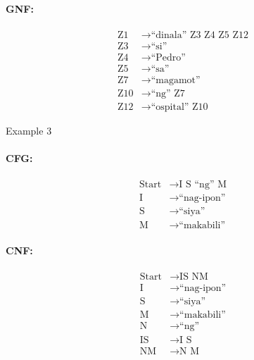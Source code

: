 \paragraph{GNF:}
\begin{equation*}
    \begin{aligned}
        \text{Z1}   & \rightarrow \text{“dinala” Z3 Z4 Z5 Z12}   \\
        \text{Z3} & \rightarrow \text{“si”} \\
        \text{Z4} & \rightarrow \text{“Pedro”} \\
        \text{Z5} & \rightarrow \text{“sa”} \\
        \text{Z7} & \rightarrow \text{“magamot”} \\
        \text{Z10} & \rightarrow \text{“ng” Z7} \\
        \text{Z12} & \rightarrow \text{“ospital” Z10}
    \end{aligned}
\end{equation*}

Example 3
\paragraph{CFG:}
\begin{equation*}
    \begin{aligned}
        \text{Start}   & \rightarrow \text{I S “ng” M}   \\
        \text{I} & \rightarrow \text{“nag-ipon”} \\
        \text{S} & \rightarrow \text{“siya”} \\
        \text{M} & \rightarrow \text{“makabili”}
    \end{aligned}
\end{equation*}

\paragraph{CNF:}
\begin{equation*}
    \begin{aligned}
        \text{Start}   & \rightarrow \text{IS NM}   \\
        \text{I} & \rightarrow \text{“nag-ipon”} \\
        \text{S} & \rightarrow \text{“siya”} \\
        \text{M} & \rightarrow \text{“makabili”} \\
        \text{N} & \rightarrow \text{“ng”} \\
        \text{IS} & \rightarrow \text{I S} \\
        \text{NM} & \rightarrow \text{N M}
    \end{aligned}
\end{equation*}

